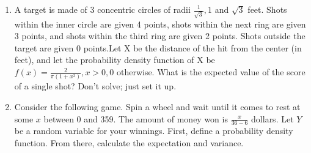 
\begin{enumerate}
\item A target is made of 3 concentric circles of radii 
$\frac{1}{\sqrt{3}}, 1$ and $\sqrt{3}$ feet. Shots within the 
inner circle are given 4 points, shots within the next ring are 
given 3 points, and shots within the third ring are given 2 points. 
Shots outside the target are given 0 points.Let X be the distance 
of the hit from the center (in feet), and let the probability 
density function of X be
$f(x) =\frac{2}{\pi(1+x^2)},  x > 0, 0 $ otherwise.
What is the expected value of the score of a single shot? 
Don’t solve; just set it up. 



\item Consider the following game. Spin a wheel and wait until 
it comes to rest at some $x$ between 0 and 359. The amount of 
money won is $\frac{x}{36 - 6}$ dollars. Let $Y$ be a random 
variable for your winnings. First, define a probability density 
function. From there, calculate the expectation and variance. 






\end{enumerate}